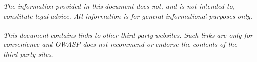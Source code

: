 \textit{The information provided in this document does not, and is not intended
to, constitute legal advice. All information is for general informational
purposes only.\\
\\
This document contains links to other third-party websites. Such links are only
for convenience and OWASP does not recommend or endorse the contents of the
third-party sites.
}